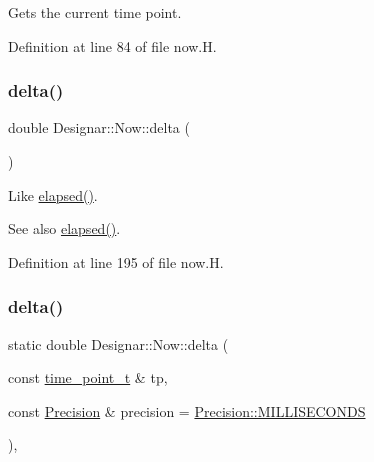 Gets the current time point. 



Definition at line 84 of file now.\+H.

\mbox{\label{class_designar_1_1_now_ae2a46a7ff8392fbadc9fb28ee17f7f5a}} 
\subsubsection{\texorpdfstring{delta()}{delta()}\hspace{0.1cm}{\footnotesize\ttfamily [1/2]}}
{\footnotesize\ttfamily double Designar\+::\+Now\+::delta (\begin{DoxyParamCaption}{ }\end{DoxyParamCaption})\hspace{0.3cm}{\ttfamily [inline]}}

Like \hyperlink{class_designar_1_1_now_a3219d85172fc9628ef90f66c1d69a8e0}{elapsed()}.

\begin{DoxySeeAlso}{See also}
\hyperlink{class_designar_1_1_now_a3219d85172fc9628ef90f66c1d69a8e0}{elapsed()}. 
\end{DoxySeeAlso}


Definition at line 195 of file now.\+H.

\mbox{\label{class_designar_1_1_now_a413d1f85c9cc6ac8dde02538bce052f2}} 
\subsubsection{\texorpdfstring{delta()}{delta()}\hspace{0.1cm}{\footnotesize\ttfamily [2/2]}}
{\footnotesize\ttfamily static double Designar\+::\+Now\+::delta (\begin{DoxyParamCaption}\item[{const \hyperlink{namespace_designar_a0edbd598eadb672df2c70e5af4dfccee}{time\+\_\+point\+\_\+t} \&}]{tp,  }\item[{const \hyperlink{class_designar_1_1_now_a3c9f5e57907c88cbe63c70a64638c072}{Precision} \&}]{precision = {\ttfamily \hyperlink{class_designar_1_1_now_a3c9f5e57907c88cbe63c70a64638c072ab4fd5e5c06e72437a57379576df36936}{Precision\+::\+M\+I\+L\+L\+I\+S\+E\+C\+O\+N\+DS}} }\end{DoxyParamCaption})\hspace{0.3cm}{\ttfamily [inline]}, {\ttfamily [static]}}


